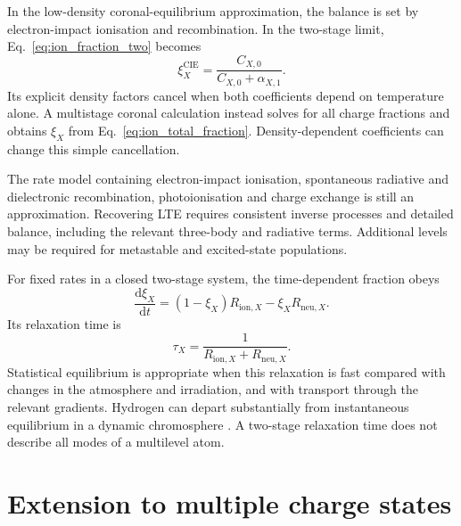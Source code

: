 \documentclass[a4paper,10pt,twoside,openany]{book}
\begin{document}
In the low-density coronal-equilibrium approximation, the balance is set by
electron-impact ionisation and recombination. In the two-stage limit,
Eq.~\eqref{eq:ion_fraction_two} becomes
\begin{equation}
 \xi_X^{\mathrm{CIE}}
 =\frac{C_{X,0}}{C_{X,0}+\alpha_{X,1}}.
 \label{eq:ion_cie_two}
\end{equation}
Its explicit density factors cancel when both coefficients depend on
temperature alone. A multistage coronal calculation instead solves for all
charge fractions and obtains \(\xi_X\) from Eq.~\eqref{eq:ion_total_fraction}.
Density-dependent coefficients can change this simple cancellation.

The rate model containing electron-impact ionisation, spontaneous radiative
and dielectronic recombination, photoionisation and charge exchange is still
an approximation. Recovering LTE requires consistent inverse processes and
detailed balance, including the relevant three-body and radiative terms.
Additional levels may be required for metastable and excited-state populations.

For fixed rates in a closed two-stage system, the time-dependent fraction obeys
\begin{equation}
 \frac{\mathrm d\xi_X}{\mathrm dt}
 =(1-\xi_X)R_{\mathrm{ion},X}
 -\xi_X R_{\mathrm{neu},X}.
 \label{eq:ion_time_two}
\end{equation}
Its relaxation time is
\begin{equation}
 \tau_X=\frac{1}{R_{\mathrm{ion},X}+R_{\mathrm{neu},X}}.
 \label{eq:ion_relaxation}
\end{equation}
Statistical equilibrium is appropriate when this relaxation is fast compared
with changes in the atmosphere and irradiation, and with transport through
the relevant gradients. Hydrogen can depart substantially from instantaneous
equilibrium in a dynamic chromosphere \cite{carlsson2002}.
A two-stage relaxation time does not describe all modes of a multilevel atom.

\section{Extension to multiple charge states}
\label{subsec:ion_multistage}
\end{document}
